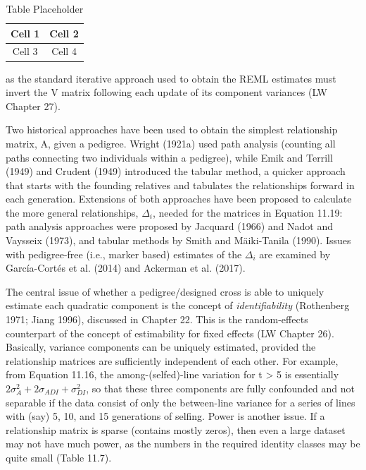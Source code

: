 \documentclass{article}
\begin{document}
\begin{table}[h]
\centering
\begin{tabular}{|c|c|}
\hline
Cell 1 & Cell 2 \\
\hline
Cell 3 & Cell 4 \\
\hline
\end{tabular}
\caption{Table Placeholder}
\end{table}

as the standard iterative approach used to obtain the REML estimates must invert the V matrix following each update of its component variances (LW Chapter 27).

Two historical approaches have been used to obtain the simplest relationship matrix, A, given a pedigree. Wright (1921a) used path analysis (counting all paths connecting two individuals within a pedigree), while Emik and Terrill (1949) and Crudent (1949) introduced the tabular method, a quicker approach that starts with the founding relatives and tabulates the relationships forward in each generation. Extensions of both approaches have been proposed to calculate the more general relationships,  $ \Delta_{i} $, needed for the matrices in Equation 11.19: path analysis approaches were proposed by Jacquard (1966) and Nadot and Vaysseix (1973), and tabular methods by Smith and Mäiki-Tanila (1990). Issues with pedigree-free (i.e., marker based) estimates of the  $ \Delta_{i} $ are examined by García-Cortés et al. (2014) and Ackerman et al. (2017).

The central issue of whether a pedigree/designed cross is able to uniquely estimate each quadratic component is the concept of \textit{identifiability} (Rothenberg 1971; Jiang 1996), discussed in Chapter 22. This is the random-effects counterpart of the concept of estimability for fixed effects (LW Chapter 26). Basically, variance components can be uniquely estimated, provided the relationship matrices are sufficiently independent of each other. For example, from Equation 11.16, the among-(selfed)-line variation for t > 5 is essentially  $ 2\sigma_{A}^{2} + 2\sigma_{ADI} + \sigma_{DI}^{2} $, so that these three components are fully confounded and not separable if the data consist of only the between-line variance for a series of lines with (say) 5, 10, and 15 generations of selfing. Power is another issue. If a relationship matrix is sparse (contains mostly zeros), then even a large dataset may not have much power, as the numbers in the required identity classes may be quite small (Table 11.7).
\end{document}
